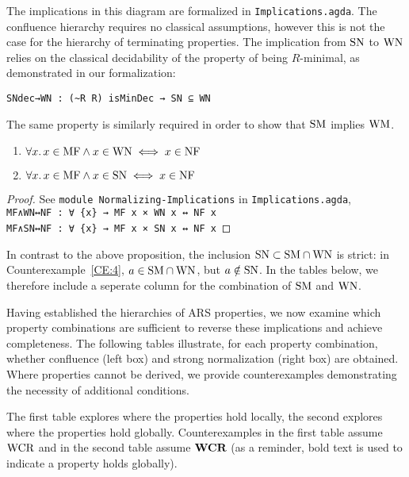 The implications in this diagram are formalized in \texttt{Implications.agda}.
The confluence hierarchy requires no classical assumptions, however this is not the case for the hierarchy of terminating properties.
The implication from $\mathrm{SN}$ to $\mathrm{WN}$ relies on the classical decidability of the property
of being $R$-minimal, as demonstrated in our formalization:

\verb|SNdec→WN : (~R R) isMinDec → SN ⊆ WN|

The same property is similarly required in order to show that $\mathrm{SM}$ implies $\mathrm{WM}$.

\begin{proposition}\label{prop:MFtoNF} \hfill
    \begin{enumerate}
        \item $\forall x.\, x\in \mathrm{MF} \land x \in \mathrm{WN} \iff x \in \mathrm{NF}$
        \item $\forall x.\, x\in \mathrm{MF} \land x \in \mathrm{SN} \iff x \in \mathrm{NF}$
    \end{enumerate}

\end{proposition}
\begin{proof}
    See \texttt{module Normalizing-Implications} in \texttt{Implications.agda},\\
    \verb|MF∧WN↔NF : ∀ {x} → MF x × WN x ↔ NF x|\\
    \verb|MF∧SN↔NF : ∀ {x} → MF x × SN x ↔ NF x| \qedhere
\end{proof}

In contrast to the above proposition, the inclusion $\mathrm{SN} \subset \mathrm{SM} \cap \mathrm{WN} $ is strict: in Counterexample~\ref{CE:4}, $a \in \mathrm{SM} \cap \mathrm{WN}$, but $a \notin \mathrm{SN}$. In the tables below, we therefore include a seperate column for the combination of $\mathrm{SM}$ and $\mathrm{WN}$.   

Having established the hierarchies of ARS properties, we now examine which property combinations are sufficient to reverse these implications and achieve completeness. The following tables illustrate, for each property combination, whether confluence (left box) and strong normalization (right box) are obtained. Where properties cannot be derived, we provide counterexamples demonstrating the necessity of additional conditions.

The first table explores where the properties hold locally, the second explores where the properties hold globally. Counterexamples in the
first table assume $\mathrm{WCR}$ and in the second table assume $\mathbf{WCR}$ (as a reminder, bold text is used to indicate a property holds globally).

